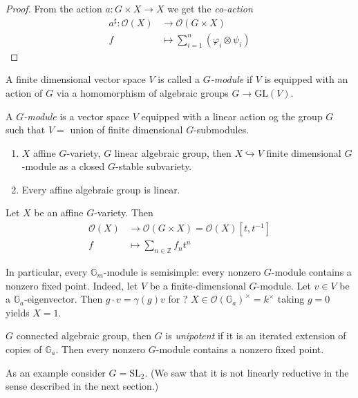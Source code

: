 \begin{proof}
From the action $a:G \times X \to X$ we get the {\it co-action} 
\begin{align*}
a^\sharp: \mathcal{O}(X) &\longrightarrow \mathcal{O}(G \times X) \\
f &\longmapsto \sum_{i=1}^n(\varphi_i \otimes \psi_i)
\end{align*}
\end{proof}

\begin{definition}
\label{definition-G-module}
A finite dimensional vector space $V$ is called a {\it $G$-module} if $V$ is equipped
with an action of $G$ via a homomorphism of algebraic groups 
$G \to \text{GL}(V)$.

A  {\it $G$-module} is a vector space $V$ equipped with a linear action og the
group $G$ such that $V=$ union of finite dimensional $G$-submodules.
\end{definition}

\begin{proposition}
\label{proposition-G-modules}
 \begin{enumerate}
\item $X$ affine $G$-variety, $G$ linear algebraic group, then $X
\hookrightarrow  V$ finite dimensional $G$-module as a closed $G$-stable
subvariety.
\item Every affine algebraic group is linear.
\end{enumerate}
\end{proposition}

Let $X$ be an affine $G$-variety. Then
\begin{align*}
\mathcal{O}(X) &\longrightarrow \mathcal{O}(G\times X)
=\mathcal{O}(X)[t,t^{-1}] \\
f &\longmapsto \sum_{n \in \mathbb{Z}}f_n t^n
\end{align*}

In particular, every $\mathbb{G}_m$-module is semisimple: every nonzero
$G$-module contains a nonzero fixed point. Indeed, let $V$ be a
finite-dimensional $G$-module. Let $v \in V$ be a $\mathbb{G}_a$-eigenvector.
Then $g\cdot v=\gamma(g)v$ for ? $X \in
\mathcal{O}(\mathbb{G}_a)^{\times}=k^{\times}$ taking $g=0$ yields $X=1$.

$G$ connected algebraic group, then $G$ is {\it unipotent} if it is an iterated
extension of copies of $\mathbb{G}_a$. Then every nonzero $G$-module contains a
nonzero fixed point.

As an example consider $G=\text{SL}_2$. (We saw that it is not linearly
reductive in the sense described in the next section.)

